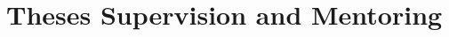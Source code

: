 \documentclass[11pt,a4paper,sans]{moderncv} %
\newcommand*{\cvmultilineitem}[3]{%
  \cvitem{#1}{#2%
    \newline{}\begin{minipage}[t]{\linewidth}\small #3\end{minipage}}}
\begin{document}



\section{Theses Supervision and Mentoring}
\end{document}
